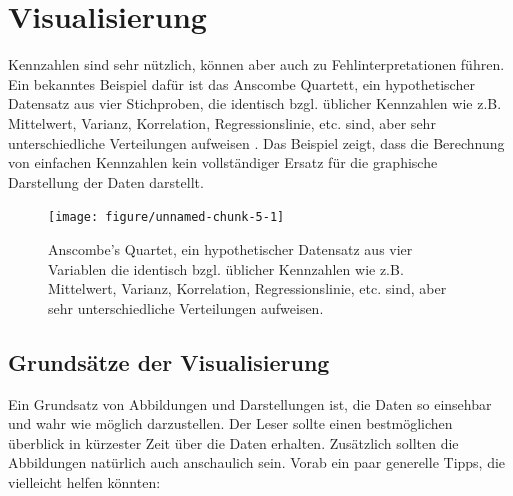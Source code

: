 \documentclass[a4paper,twoside]{tufte-book}\usepackage[]{graphicx}\usepackage[]{color}
\begin{document}
\section{Visualisierung}


Kennzahlen sind sehr nützlich, können aber auch zu Fehlinterpretationen führen. Ein bekanntes Beispiel dafür ist das Anscombe Quartett, ein hypothetischer Datensatz aus vier Stichproben, die identisch bzgl. üblicher Kennzahlen wie z.B. Mittelwert, Varianz, Korrelation, Regressionslinie, etc. sind, aber sehr unterschiedliche Verteilungen aufweisen \citep{Anscombe-Graphsinstatistical-1973}. Das Beispiel zeigt, dass die Berechnung von einfachen Kennzahlen kein vollständiger Ersatz für die graphische Darstellung der Daten darstellt.


\begin{figure}[htbp]
\begin{center}
\begin{Schunk}

\texttt{[image: figure/unnamed-chunk-5-1]} \end{Schunk}
\caption{Anscombe's Quartet, ein hypothetischer Datensatz aus vier Variablen die identisch bzgl. üblicher Kennzahlen wie z.B. Mittelwert, Varianz, Korrelation, Regressionslinie, etc. sind, aber sehr unterschiedliche Verteilungen aufweisen.}
\label{fig: Anscombes Quartet}
\end{center}
\end{figure}

\subsection{Grundsätze der Visualisierung}

Ein Grundsatz von Abbildungen und Darstellungen ist, die Daten so einsehbar und wahr wie möglich darzustellen. Der Leser sollte einen bestmöglichen überblick in kürzester Zeit über die Daten erhalten. Zusätzlich sollten die Abbildungen natürlich auch anschaulich sein. Vorab ein paar generelle Tipps, die vielleicht helfen könnten:
\end{document}
